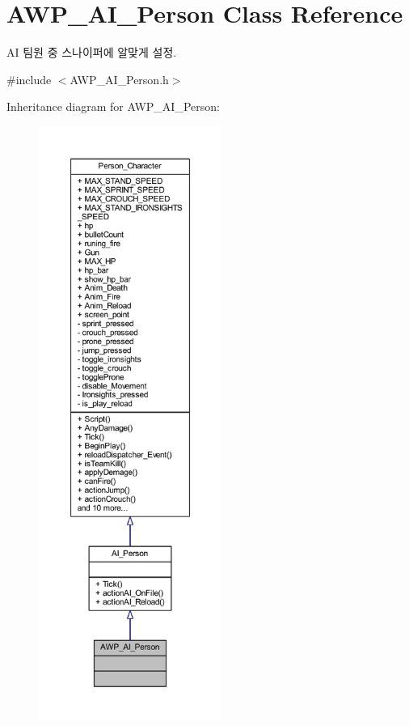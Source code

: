 \hypertarget{class_a_w_p___a_i___person}{}\section{A\+W\+P\+\_\+\+A\+I\+\_\+\+Person Class Reference}
\label{class_a_w_p___a_i___person}


AI 팀원 중 스나이퍼에 알맞게 설정.  




{\ttfamily \#include $<$A\+W\+P\+\_\+\+A\+I\+\_\+\+Person.\+h$>$}



Inheritance diagram for A\+W\+P\+\_\+\+A\+I\+\_\+\+Person\+:
\nopagebreak
\begin{figure}[H]
\begin{center}
\leavevmode
\includegraphics[height=550pt]{class_a_w_p___a_i___person__inherit__graph}
\end{center}
\end{figure}


